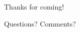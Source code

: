 \hidenum
\begin{frame}[noframenumbering]
 \begin{block}{Thanks for coming!}
 \begin{center}
     {\Large Questions?  Comments?}\\[.6cm]
  \end{center}
 \end{block}
\end{frame}
